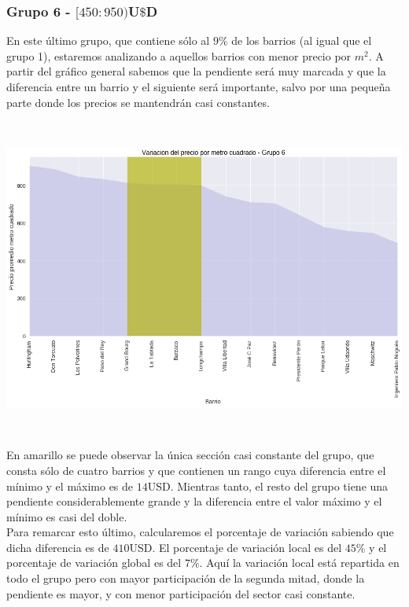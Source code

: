 \documentclass[a4paper, 10pt]{article}
\newcommand\tab[1][0.5cm]{\hspace*{#1}}
\begin{document}
				\subsubsection{Grupo 6 - $[450:950)$U$\$$D}
					En este último grupo, que contiene sólo al $9\%$ de los barrios (al igual que el grupo 1), estaremos analizando
					a aquellos barrios con menor precio por $m^2$. A partir del gráfico general sabemos que la pendiente será muy
					marcada y que la diferencia entre un barrio y el siguiente será importante, salvo por una pequeña parte donde
					los precios se mantendrán casi constantes.
					\begin{center}
   		    				\includegraphics[width=6in, height=4.13in]{images/m2Group6Area}
				  	\end{center}
					\tab En amarillo se puede observar la única sección casi constante del grupo, que consta sólo de cuatro barrios
					y que contienen un rango cuya diferencia entre el mínimo y el máximo es de $14$USD. Mientras tanto, el resto
					del grupo tiene una pendiente considerablemente grande y la diferencia entre el valor máximo y el mínimo es casi
					del doble. \\
					\tab Para remarcar esto último, calcularemos el porcentaje de variación sabiendo que dicha diferencia es de
					$410$USD. El porcentaje de variación local es del $45\%$ y el porcentaje de variación global es del $7\%$. Aquí
					la variación local está repartida en todo el grupo pero con mayor participación de la segunda mitad, donde la
					pendiente es mayor, y con menor participación del sector casi constante.\\
\end{document}
